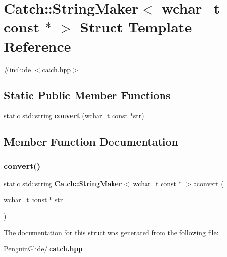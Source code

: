 \section{Catch\+::String\+Maker$<$ wchar\+\_\+t const $\ast$ $>$ Struct Template Reference}
\label{struct_catch_1_1_string_maker_3_01wchar__t_01const_01_5_01_4}


{\ttfamily \#include $<$catch.\+hpp$>$}

\subsection*{Static Public Member Functions}
\begin{DoxyCompactItemize}
\item 
static std\+::string \textbf{ convert} (wchar\+\_\+t const $\ast$str)
\end{DoxyCompactItemize}


\subsection{Member Function Documentation}
\mbox{\label{struct_catch_1_1_string_maker_3_01wchar__t_01const_01_5_01_4_ae7535a1f417ace45ca05e4389334ffeb}} 
\subsubsection{convert()}
{\footnotesize\ttfamily static std\+::string \textbf{ Catch\+::\+String\+Maker}$<$ wchar\+\_\+t const $\ast$ $>$\+::convert (\begin{DoxyParamCaption}\item[{wchar\+\_\+t const $\ast$}]{str }\end{DoxyParamCaption})\hspace{0.3cm}{\ttfamily [static]}}



The documentation for this struct was generated from the following file\+:\begin{DoxyCompactItemize}
\item 
Penguin\+Glide/\textbf{ catch.\+hpp}\end{DoxyCompactItemize}
